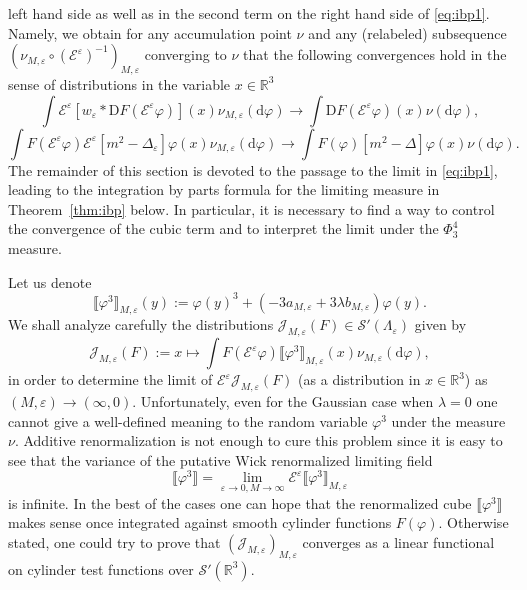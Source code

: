 \documentclass[a4paper,11pt]{article}
\newcommand{\assign}{:=}
\newcommand{\mathD}{\mathrm{D}}
\newcommand{\mathd}{\mathrm{d}}
\numberwithin{equation}{section}
\begin{document}
left hand side as well as in the second term on the right hand side of
{\eqref{eq:ibp1}}. Namely, we obtain for any accumulation point $\nu$ and any
(relabeled) subsequence $(\nu_{M, \varepsilon} \circ
(\mathcal{E}^{\varepsilon})^{- 1})_{M, \varepsilon}$ converging to $\nu$ that
the following convergences hold in the sense of distributions in the variable
$x \in \mathbb{R}^3$
\[ \int \mathcal{E}^{\varepsilon} [w_{\varepsilon} \ast \mathD F
   (\mathcal{E}^{\varepsilon} \varphi)] (x) \nu_{M, \varepsilon} (\mathd
   \varphi) \rightarrow \int \mathD F (\mathcal{E}^{\varepsilon} \varphi) (x)
   \nu (\mathd \varphi), \]
\[ \int F (\mathcal{E}^{\varepsilon} \varphi) \mathcal{E}^{\varepsilon} [m^2 -
   \Delta_{\varepsilon}] \varphi (x) \nu_{M, \varepsilon} (\mathd \varphi)
   \rightarrow \int F (\varphi) [m^2 - \Delta] \varphi (x) \nu (\mathd
   \varphi) . \]
The remainder of this section is devoted to the passage to the limit in
{\eqref{eq:ibp1}}, leading to the integration by parts formula for the
limiting measure in Theorem~\ref{thm:ibp} below. In particular, it is
necessary to find a way to control the convergence of the cubic term and to
interpret the limit under the $\Phi^4_3$ measure.

Let us denote
\[ \llbracket \varphi^3 \rrbracket_{M, \varepsilon} (y) \assign \varphi (y)^3
   + (- 3 a_{M, \varepsilon} + 3\lambda b_{M, \varepsilon}) \varphi (y) . \]
We shall analyze carefully the distributions $\mathcal{J}_{M, \varepsilon} (F)
\in \mathcal{S}' (\Lambda_{\varepsilon})$ given by
\[ \mathcal{J}_{M, \varepsilon} (F) \assign x \mapsto \int F
   (\mathcal{E}^{\varepsilon} \varphi) \llbracket \varphi^3 \rrbracket_{M,
   \varepsilon} (x) \nu_{M, \varepsilon} (\mathd \varphi), \]
in order to determine the limit of $\mathcal{E}^{\varepsilon} \mathcal{J}_{M,
\varepsilon} (F)$ (as a distribution in $x \in \mathbb{R}^3$) as $(M,
\varepsilon) \rightarrow (\infty, 0)$. Unfortunately, even for the Gaussian
case when $\lambda = 0$ one cannot give a well-defined meaning to the random
variable $\varphi^3$ under the measure $\nu$. Additive renormalization is not
enough to cure this problem since it is easy to see that the variance of the
putative Wick renormalized limiting field
\[ \llbracket \varphi^3 \rrbracket = \lim_{\varepsilon \rightarrow 0, M
   \rightarrow \infty} \mathcal{E}^{\varepsilon} \llbracket \varphi^3
   \rrbracket_{M, \varepsilon} \]
is infinite. In the best of the cases one can hope that the renormalized cube
$\llbracket \varphi^3 \rrbracket$ makes sense once integrated against smooth
cylinder functions $F (\varphi)$. Otherwise stated, one could try to prove
that $(\mathcal{J}_{M, \varepsilon})_{M, \varepsilon}$ converges as a linear
functional on cylinder test functions over $\mathcal{S}' (\mathbb{R}^3)$.
\end{document}
